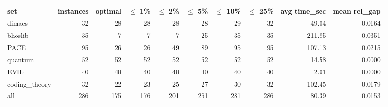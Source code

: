 \begin{tabular}{lrrrrrrrrr}
\toprule
set & instances & optimal & $\leq$ 1\% & $\leq$ 2\% & $\leq$ 5\% & $\leq$ 10\% & $\leq$ 25\% & avg time\_sec & mean rel\_gap \\
\midrule
dimacs & 32 & 28 & 28 & 28 & 28 & 29 & 32 & 49.04 & 0.0164 \\
bhoslib & 35 & 7 & 7 & 7 & 25 & 35 & 35 & 211.85 & 0.0351 \\
PACE & 95 & 26 & 26 & 49 & 89 & 95 & 95 & 107.13 & 0.0215 \\
quantum & 52 & 52 & 52 & 52 & 52 & 52 & 52 & 14.58 & 0.0000 \\
EVIL & 40 & 40 & 40 & 40 & 40 & 40 & 40 & 2.01 & 0.0000 \\
coding\_theory & 32 & 22 & 23 & 25 & 27 & 30 & 32 & 102.45 & 0.0179 \\
\midrule
all & 286 & 175 & 176 & 201 & 261 & 281 & 286 & 80.39 & 0.0153 \\
\bottomrule
\end{tabular}
